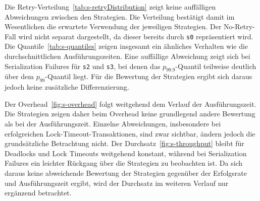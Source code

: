 

Die Retry-Verteilung~\ref{tab:s-retryDistribution} zeigt keine auffälligen Abweichungen zwischen den Strategien.
Die Verteilung bestätigt damit im Wesentlichen die erwartete Verwendung der jeweiligen Strategien.
Der No-Retry-Fall wird nicht separat dargestellt, da dieser bereits durch \texttt{s0} repräsentiert wird.
Die Quantile~\ref{tab:s-quantiles} zeigen insgesamt ein ähnliches Verhalten wie die durchschnittlichen
Ausführungszeiten.
Eine auffällige Abweichung zeigt sich bei Serialization Failures für \texttt{s2} und \texttt{s3}, bei denen
das $p_{99.9}$-Quantil teilweise deutlich über dem $p_{99}$-Quantil liegt.
Für die Bewertung der Strategien ergibt sich daraus jedoch keine zusätzliche Differenzierung.

Der Overhead~\ref{fig:s-overhead} folgt weitgehend dem Verlauf der Ausführungszeit.
Die Strategien zeigen daher beim Overhead keine grundlegend andere Bewertung als bei der Ausführungszeit.
Einzelne Abweichungen, insbesondere bei erfolgreichen Lock-Timeout-Transaktionen, sind zwar sichtbar, ändern jedoch
die grundsätzliche Betrachtung nicht.
Der Durchsatz~\ref{fig:s-throughput} bleibt für Deadlocks und Lock Timeouts weitgehend konstant, während bei
Serialization Failures ein leichter Rückgang über die Strategien zu beobachten ist.
Da sich daraus keine abweichende Bewertung der Strategien gegenüber der Erfolgsrate und Ausführungszeit ergibt, wird
der Durchsatz im weiteren Verlauf nur ergänzend betrachtet.